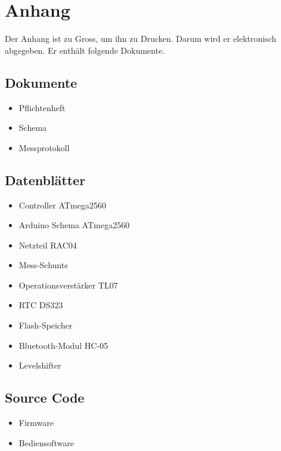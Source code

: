 \pagebreak
\section{Anhang}
Der Anhang ist zu Gross, um ihn zu Drucken. Darum wird er elektronisch abgegeben. Er enthält folgende Dokumente.

\subsection*{Dokumente}
\begin{itemize}
\item Pflichtenheft
\item Schema
\item Messprotokoll
\end{itemize}

\subsection*{Datenblätter}
\begin{itemize}
\item Controller ATmega2560
\item Arduino Schema ATmega2560
\item Netzteil RAC04
\item Mess-Schunts
\item Operationsverstärker TL07
\item RTC DS323
\item Flash-Speicher 
\item Bluetooth-Modul HC-05
\item Levelshifter
\end{itemize}

\subsection*{Source Code}
\begin{itemize}
\item Firmware
\item Bediensoftware
\end{itemize}

